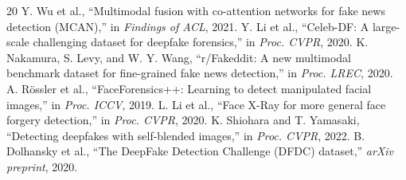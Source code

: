 \documentclass[conference]{IEEEtran}
\begin{document}
\begin{thebibliography}{20}
 Y. Wu et al., ``Multimodal fusion with co-attention networks for fake news detection (MCAN),'' in \textit{Findings of ACL}, 2021.
 Y. Li et al., ``Celeb-DF: A large-scale challenging dataset for deepfake forensics,'' in \textit{Proc. CVPR}, 2020.
 K. Nakamura, S. Levy, and W. Y. Wang, ``r/Fakeddit: A new multimodal benchmark dataset for fine-grained fake news detection,'' in \textit{Proc. LREC}, 2020.
 A. R\"ossler et al., ``FaceForensics++: Learning to detect manipulated facial images,'' in \textit{Proc. ICCV}, 2019.
 L. Li et al., ``Face X-Ray for more general face forgery detection,'' in \textit{Proc. CVPR}, 2020.
 K. Shiohara and T. Yamasaki, ``Detecting deepfakes with self-blended images,'' in \textit{Proc. CVPR}, 2022.
 B. Dolhansky et al., ``The DeepFake Detection Challenge (DFDC) dataset,'' \textit{arXiv preprint}, 2020.
\end{thebibliography}
\end{document}
